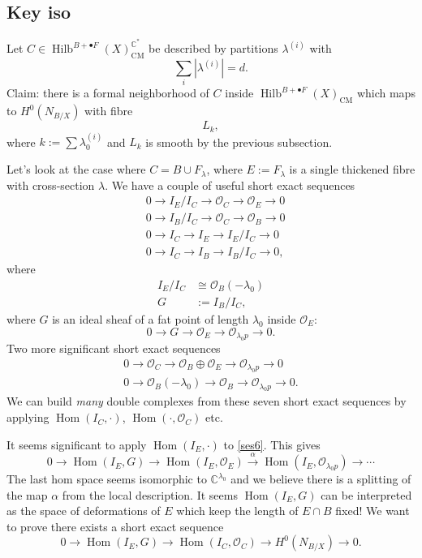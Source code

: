 \documentclass{amsart}
\theoremstyle{definition}
\newcommand{\CC} {\mathbb{C}}          %
\renewcommand{\O}{\mathcal{O}}
\newcommand{\Hom}{\operatorname{Hom}}
\newcommand{\Hilb}{\operatorname{Hilb}}
\newcommand{\CM}{\operatorname{CM}}
\begin{document}
\subsection{Key iso}

Let $C \in \Hilb^{B+\bullet F}(X)^{\CC^*}_{\CM}$ be described by partitions $\lambda^{(i)}$ with
\[
\sum_i |\lambda^{(i)}| = d.
\]
Claim: there is a formal neighborhood of $C$ inside $\Hilb^{B+\bullet F}(X)_{\CM}$ which maps to $H^0(N_{B/X})$ with fibre
$$
L_{k},
$$
where $k := \sum \lambda_{0}^{(i)}$ and $L_k$ is smooth by the previous subsection. 


Let's look at the case where $C = B \cup F_{\lambda}$, where $E:=F_\lambda$ is a single thickened fibre with cross-section $\lambda$. We have a couple of useful short exact sequences
\begin{align}
&0 \rightarrow I_E / I_C \rightarrow \O_C \rightarrow \O_E \rightarrow 0 \label{ses1} \\
&0 \rightarrow I_B / I_C \rightarrow \O_C \rightarrow \O_B \rightarrow 0 \label{ses2} \\
&0 \rightarrow I_C \rightarrow I_E \rightarrow I_E / I_C \rightarrow 0 \label{ses3} \\
&0 \rightarrow I_C \rightarrow I_B \rightarrow I_B / I_C \rightarrow 0, \label{ses4}
\end{align}
where 
\begin{align*}
I_E / I_C &\cong \O_B(-\lambda_0) \\
G&:=I_B / I_C,
\end{align*}
where $G$ is an ideal sheaf of a fat point of length $\lambda_0$ inside $\O_{E}$:
\begin{equation} \label{ses5}
0 \rightarrow G \rightarrow \O_E \rightarrow \O_{\lambda_0 p} \rightarrow 0.
\end{equation}
Two more significant short exact sequences
\begin{align} 
0 \rightarrow \O_C \rightarrow \O_B \oplus \O_E \rightarrow \O_{\lambda_0 p} \rightarrow 0 \label{ses6} \\
0 \rightarrow \O_B(-\lambda_0) \rightarrow \O_B \rightarrow \O_{\lambda_0 p} \rightarrow 0. \label{ses7}
\end{align}
We can build \emph{many} double complexes from these seven short exact sequences by applying $\Hom(I_C,\cdot)$, $\Hom(\cdot, \O_C)$ etc. 

It seems significant to apply $\Hom(I_E, \cdot)$ to \eqref{ses6}. This gives
\begin{equation} \label{split}
0 \rightarrow \Hom(I_E,G) \rightarrow \Hom(I_E,\O_E) \stackrel{\alpha}{\rightarrow} \Hom(I_E,\O_{\lambda_0 p}) \rightarrow \cdots
\end{equation}
The last hom space seems isomorphic to $\CC^{\lambda_0}$ and we believe there is a splitting of the map $\alpha$ from the local description. It seems $\Hom(I_E,G)$ can be interpreted as the space of deformations of $E$ which keep the length of $E \cap B$ fixed! We want to prove there exists a short exact sequence
$$
0 \rightarrow \Hom(I_E,G) \rightarrow \Hom(I_C,\O_C) \rightarrow H^0(N_{B/X}) \rightarrow 0.
$$
\end{document}
